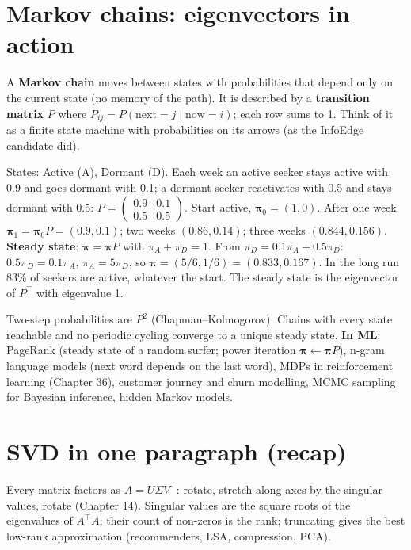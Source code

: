 \section{Markov chains: eigenvectors in action}
A \textbf{Markov chain} moves between states with probabilities that depend only on the current state (no memory of the path). It is described by a \textbf{transition matrix} $P$
where $P_{ij} = P(\text{next} = j\mid\text{now} = i)$; each row sums to 1. Think of it as a finite state machine with probabilities on its arrows (as the InfoEdge candidate did).
\begin{example}
States: Active (A), Dormant (D). Each week an active seeker stays active with 0.9 and goes dormant with 0.1; a dormant seeker reactivates with 0.5 and stays dormant with 0.5:
$P = \begin{pmatrix}0.9 & 0.1\\0.5 & 0.5\end{pmatrix}$.
Start active, $\boldsymbol\pi_0 = (1, 0)$. After one week $\boldsymbol\pi_1 = \boldsymbol\pi_0P = (0.9, 0.1)$; two weeks $(0.86, 0.14)$; three weeks $(0.844, 0.156)$.
\textbf{Steady state}: $\boldsymbol\pi = \boldsymbol\pi P$ with $\pi_A + \pi_D = 1$. From $\pi_D = 0.1\pi_A + 0.5\pi_D$: $0.5\pi_D = 0.1\pi_A$, $\pi_A = 5\pi_D$, so $\boldsymbol\pi = (5/6, 1/6)
= (0.833, 0.167)$. In the long run 83\% of seekers are active, whatever the start. The steady state is the eigenvector of $P^\top$ with eigenvalue 1.
\end{example}
Two-step probabilities are $P^2$ (Chapman--Kolmogorov). Chains with every state reachable and no periodic cycling converge to a unique steady state.
\textbf{In ML}: PageRank (steady state of a random surfer; power iteration $\boldsymbol\pi\leftarrow\boldsymbol\pi P$), n-gram language models (next word depends on the last word),
MDPs in reinforcement learning (Chapter 36), customer journey and churn modelling, MCMC sampling for Bayesian inference, hidden Markov models.

\section{SVD in one paragraph (recap)}
Every matrix factors as $A = U\Sigma V^\top$: rotate, stretch along axes by the singular values, rotate (Chapter 14). Singular values are the square roots of the eigenvalues of
$A^\top A$; their count of non-zeros is the rank; truncating gives the best low-rank approximation (recommenders, LSA, compression, PCA).

